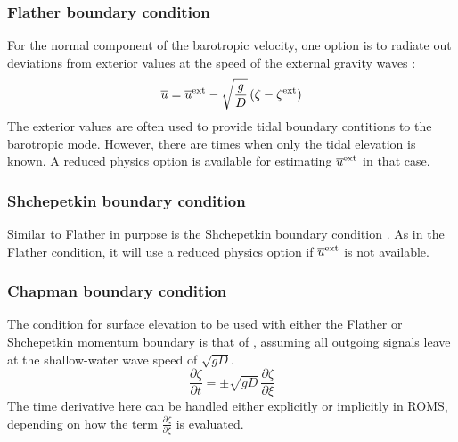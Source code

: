 \subsubsection{Flather boundary condition}
For the normal component of the barotropic velocity, one option is
to radiate out deviations from exterior values at the speed of the external
gravity waves \citep{Flather76}:
\begin{equation}
  \overline{u} = \overline{u}^{\rm ext} - \sqrt{\frac{g}{D}} \,
  (\zeta - \zeta^{\rm ext})
\end{equation}
The exterior values are often used to provide tidal
boundary contitions to the barotropic mode. However, there are times
when only the tidal elevation is known. A reduced physics option
is available for estimating $\overline{u}^{\rm ext}$ in that case.

\subsubsection{Shchepetkin boundary condition}
Similar to Flather in purpose is the Shchepetkin boundary condition
\citep{Mason2010}. As in the Flather condition, it
will use a reduced physics option if $\overline{u}^{\rm ext}$ is not
available.

\subsubsection{Chapman boundary condition}
The condition for surface elevation to be used with either the Flather or
Shchepetkin momentum boundary is that of
\citep{Chapman85}, assuming all outgoing signals leave
at the shallow-water wave speed of $\sqrt{gD}$.
\begin{equation}
  \frac{\partial \zeta}{\partial t} = \pm \sqrt{gD} \,
  \frac{\partial \zeta}{\partial \xi}
\end{equation}
The time derivative here can be handled either explicitly or
implicitly in ROMS, depending on how the term
$\frac{\partial \zeta}{\partial \xi}$ is evaluated.

